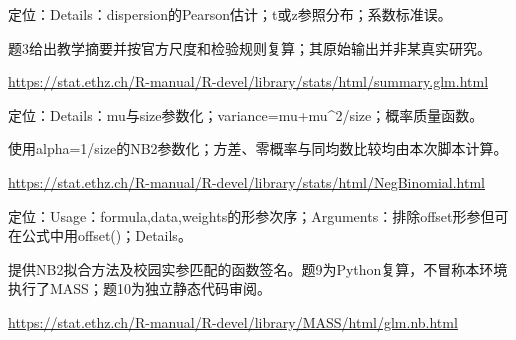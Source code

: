 \par\noindent\begin{minipage}{\linewidth}\raggedright{}\label{src:G7-R-SUMMARY}
\par
定位：Details：dispersion的Pearson估计；t或z参照分布；系数标准误。\par
题3给出教学摘要并按官方尺度和检验规则复算；其原始输出并非某真实研究。\par
{\small \url{https://stat.ethz.ch/R-manual/R-devel/library/stats/html/summary.glm.html}}\par
\end{minipage}\par\medskip

\par\noindent\begin{minipage}{\linewidth}\raggedright{}\label{src:G7-R-NEGBIN}
\par
定位：Details：mu与size参数化；variance=mu+mu\textasciicircum{}2/size；概率质量函数。\par
使用alpha=1/size的NB2参数化；方差、零概率与同均数比较均由本次脚本计算。\par
{\small \url{https://stat.ethz.ch/R-manual/R-devel/library/stats/html/NegBinomial.html}}\par
\end{minipage}\par\medskip

\par\noindent\begin{minipage}{\linewidth}\raggedright{}\label{src:G7-R-GLMNB}
\par
定位：Usage：formula,data,weights的形参次序；Arguments：排除offset形参但可在公式中用offset()；Details。\par
提供NB2拟合方法及校园实参匹配的函数签名。题9为Python复算，不冒称本环境执行了MASS；题10为独立静态代码审阅。\par
{\small \url{https://stat.ethz.ch/R-manual/R-devel/library/MASS/html/glm.nb.html}}\par
\end{minipage}\par\medskip

